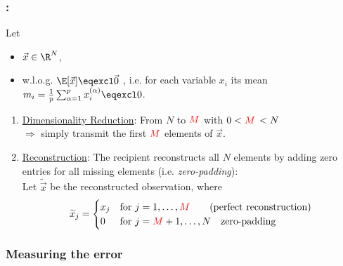 \begin{frame}\frametitle{\subsecname:~\subsubsecname}

Let
\svspace{-5mm}
\begin{itemize}
\item[]$\vec x \in \R^N$,\\
\item[] w.l.o.g. $\E[\vec x] \eqexcl \vec 0$ \notesonly{\\

}, i.e. for each variable $x_i$ its mean $m_i = \frac{1}{p} \sum_{\alpha=1}^{p} x_i^{(\alpha)} \eqexcl 0$.
\end{itemize}

\pause

\begin{enumerate}
\item \underline{Dimensionality Reduction}: From $N$ to $\color{red}M$ with $0 < {\color{red}M}\, < N$\\
$\Rightarrow$ simply transmit the first $\color{red}M$ elements of $\vec x$. 
\pause
\item \underline{Reconstruction}: The recipient reconstructs all $N$ elements by adding zero entries for all missing elements (i.e. \textit{zero-padding}):\\
Let $\widetilde{\vec{x}}$ be the reconstructed observation, where\\ 
 
 \begin{equation}
 \widetilde{x}_j = \begin{cases} 
      {x}_j & \text{for}~j=1,\ldots,{\color{red}M} \qquad \text{(perfect reconstruction)} \\
      0 & \text{for}~j={\color{red}M}+1,\ldots,N \quad \text{zero-padding} 
   \end{cases}
 \end{equation}
\end{enumerate}


\end{frame}

\subsubsection{Measuring the error}\label{sec:objective}

